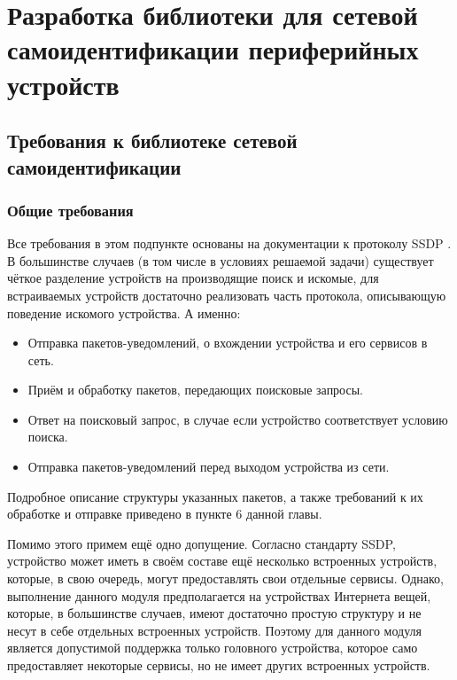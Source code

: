 \chapter{Разработка библиотеки для сетевой самоидентификации периферийных устройств}

\section{Требования к библиотеке сетевой самоидентификации}

\subsection{Общие требования}

Все требования в этом подпункте основаны на документации к протоколу SSDP \cite{web:upnp}.
В большинстве случаев (в том числе в условиях решаемой задачи) существует чёткое разделение устройств на производящие поиск и искомые, для встраиваемых устройств достаточно реализовать часть протокола, описывающую поведение искомого устройства.
А именно:
\begin{itemize}
	\item Отправка пакетов-уведомлений, о вхождении устройства и его сервисов в сеть.
	\item Приём и обработку пакетов, передающих поисковые запросы.
	\item Ответ на поисковый запрос, в случае если устройство соответствует условию поиска.
	\item Отправка пакетов-уведомлений перед выходом устройства из сети.
\end{itemize}
Подробное описание структуры указанных пакетов, а также требований к их обработке и отправке приведено в пункте 6 данной главы.

Помимо этого примем ещё одно допущение.
Согласно стандарту SSDP, устройство может иметь в своём составе ещё несколько встроенных устройств, которые, в свою очередь, могут предоставлять свои отдельные сервисы.
Однако, выполнение данного модуля предполагается на устройствах Интернета вещей, которые, в большинстве случаев, имеют достаточно простую структуру и не несут в себе отдельных встроенных устройств.
Поэтому для данного модуля является допустимой поддержка только головного устройства, которое само предоставляет некоторые сервисы, но не имеет других встроенных устройств.

